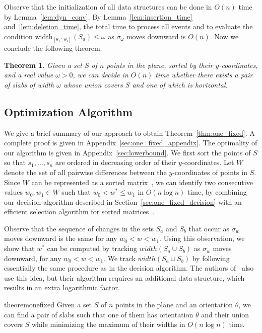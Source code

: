 \documentclass[10pt,a4paper]{article}
\newtheorem{theorem}{Theorem}
\theoremstyle{star}
\theoremstyle{claimstar}
\newcommand{\width}{\ensuremath{\mathrm{width}}}
\begin{document}
Observe that the initialization of all data structures can be done in $O(n)$ time by Lemma~\ref{lem:dyn_conv}.
By Lemma~\ref{lem:insertion_time} and~\ref{lem:deletion_time}, the total time to process all events and to evaluate the condition $\width_{[\theta_1', \theta_1]}(S_a) \le \omega$ as $\sigma_\omega$ moves downward is $O(n)$. Now we conclude the following theorem.

\begin{theorem}
    \label{thm:one_fixed_decision}
    Given a set $S$ of $n$ points in the plane, sorted by their $y$-coordinates, and a real value $\omega > 0$, we can decide in $O(n)$ time whether there exists a pair of slabs of width $\omega$ whose union covers $S$ and one of which is horizontal.
\end{theorem}


\subsection{Optimization Algorithm}
\label{sec:one_fixed_optimization}

We give a brief summary of our approach to obtain Theorem~\ref{thm:one_fixed}. A complete proof is given in Appendix~\ref{sec:one_fixed_appendix}. The optimality of our algorithm is given in Appendix~\ref{sec:lowerbound}.
We first sort the points of $S$ so that $s_1, \ldots, s_n$ are ordered in decreasing order of their $y$-coordinates.
Let $W$ denote the set of all pairwise differences between the $y$-coordinates of points in $S$.
Since $W$ can be represented as a sorted matrix~\cite{frederickson1982complexity}, we can identify two consecutive values $w_0, w_1 \in W$ such that $w_0 < w^* \le w_1$ in $O(n \log n)$ time, by combining our decision algorithm described in Section~\ref{sec:one_fixed_decision} with an efficient selection algorithm for sorted matrices~\cite{frederickson1984generalized}.

Observe that the sequence of changes in the sets $S_a$ and $S_b$ that occur as $\sigma_w$ moves downward is the same for any $w_0 <w<w_1$.
Using this observation, we show that $w^*$ can be computed by tracking ${width}(S_a \cup S_b)$ as $\sigma_w$ moves downward, for any $w_0 < w < w_1$. 
We track ${width}(S_a \cup S_b)$ by following essentially the same procedure as in the decision algorithm. 
The authors of~\cite{ahn2024constrained} also use this idea, but their algorithm requires an additional data structure, which results in an extra logarithmic factor.


\begin{restatable}{theorem}{onefixed}
    \label{thm:one_fixed}
    Given a set $S$ of $n$ points in the plane and an orientation $\theta$, we can find a pair of slabs such that one of them has orientation $\theta$ and their union covers $S$ while minimizing the maximum of their widths in $O(n\log n)$ time.
\end{restatable}
\end{document}
